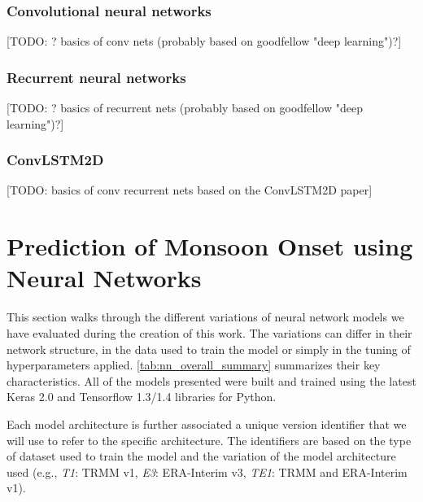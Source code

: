\subsubsection{Convolutional neural networks}
\label{sst:convolutional_networks}
[TODO: ? basics of conv nets (probably based on goodfellow "deep learning")?]

\subsubsection{Recurrent neural networks}
\label{sst:recurrent_networks}
[TODO: ? basics of recurrent nets (probably based on goodfellow "deep learning")?]

\subsubsection{ConvLSTM2D}
[TODO: basics of conv recurrent nets based on the ConvLSTM2D paper]


\clearpage
\section{Prediction of Monsoon Onset using Neural Networks}
\label{st:nn_implementation}
This section walks through the different variations of neural network models we have evaluated during the creation of this work. The variations can differ in their network structure, in the data used to train the model or simply in the tuning of hyperparameters applied. \cref{tab:nn_overall_summary} summarizes their key characteristics. All of the models presented were built and trained using the latest Keras 2.0 and Tensorflow 1.3/1.4 libraries for Python.

Each model architecture is further associated a unique version identifier that we will use to refer to the specific architecture. The identifiers are based on the type of dataset used to train the model and the variation of the model architecture used (e.g., \textit{T1}: TRMM v1, \textit{E3}: ERA-Interim v3, \textit{TE1}: TRMM and ERA-Interim v1).

